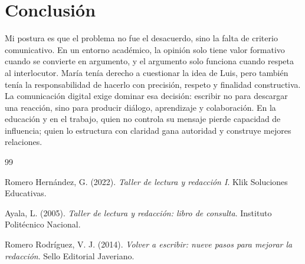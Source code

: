 \documentclass[
	spanish, %
	letterpaper, oneside
]{article}
\begin{document}
\section{Conclusión}

Mi postura es que el problema no fue el desacuerdo, sino la falta de criterio comunicativo. En un entorno académico, la opinión solo tiene valor formativo cuando se convierte en argumento, y el argumento solo funciona cuando respeta al interlocutor. María tenía derecho a cuestionar la idea de Luis, pero también tenía la responsabilidad de hacerlo con precisión, respeto y finalidad constructiva. La comunicación digital exige dominar esa decisión: escribir no para descargar una reacción, sino para producir diálogo, aprendizaje y colaboración. En la educación y en el trabajo, quien no controla su mensaje pierde capacidad de influencia; quien lo estructura con claridad gana autoridad y construye mejores relaciones.

\begin{thebibliography}{99}

Romero Hernández, G. (2022). \textit{Taller de lectura y redacción I}. Klik Soluciones Educativas.

Ayala, L. (2005). \textit{Taller de lectura y redacción: libro de consulta}. Instituto Politécnico Nacional.

Romero Rodríguez, V. J. (2014). \textit{Volver a escribir: nueve pasos para mejorar la redacción}. Sello Editorial Javeriano.
		
\end{thebibliography}

\end{document}
